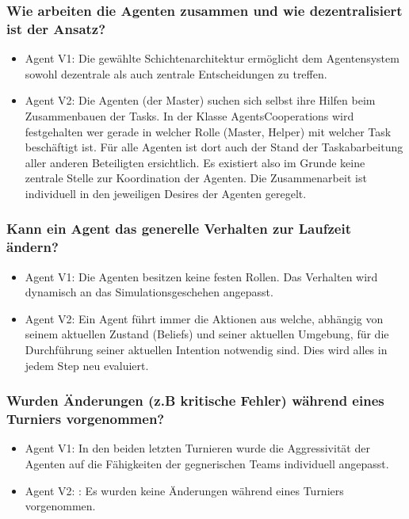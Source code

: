 \documentclass[runningheads]{llncs}
\begin{document}
	\subsubsection{Wie arbeiten die Agenten zusammen und wie dezentralisiert ist der Ansatz?}
	\begin{itemize}
		\item Agent V1: Die gewählte Schichtenarchitektur ermöglicht dem Agentensystem sowohl dezentrale als auch zentrale Entscheidungen zu treffen.
		\item Agent V2: Die Agenten (der Master) suchen sich selbst ihre Hilfen beim Zusammenbauen der Tasks. In der Klasse AgentsCooperations wird festgehalten wer gerade in welcher Rolle (Master, Helper) mit welcher Task beschäftigt ist. Für alle Agenten ist dort auch der Stand der Taskabarbeitung aller anderen Beteiligten ersichtlich. Es existiert also im Grunde keine zentrale Stelle zur Koordination der Agenten. Die Zusammenarbeit ist individuell in den jeweiligen Desires der Agenten geregelt. 
	\end{itemize}
	
	\subsubsection{Kann ein Agent das generelle Verhalten zur Laufzeit ändern?}
	\begin{itemize}
		\item Agent V1: Die Agenten besitzen keine festen Rollen. Das Verhalten wird dynamisch an das Simulationsgeschehen angepasst.
		\item Agent V2: Ein Agent führt immer die Aktionen aus welche, abhängig von seinem aktuellen Zustand (Beliefs) und seiner aktuellen Umgebung, für die Durchführung seiner aktuellen Intention notwendig sind. Dies wird alles in jedem Step neu evaluiert.
	\end{itemize}
	
	\subsubsection{Wurden Änderungen (z.B kritische Fehler) während eines Turniers vorgenommen?}
	\begin{itemize}
		\item Agent V1: In den beiden letzten Turnieren wurde die Aggressivität der Agenten auf die Fähigkeiten der gegnerischen Teams individuell angepasst.
		\item Agent V2: : Es wurden keine Änderungen während eines Turniers vorgenommen.
	\end{itemize}
	
\end{document}
